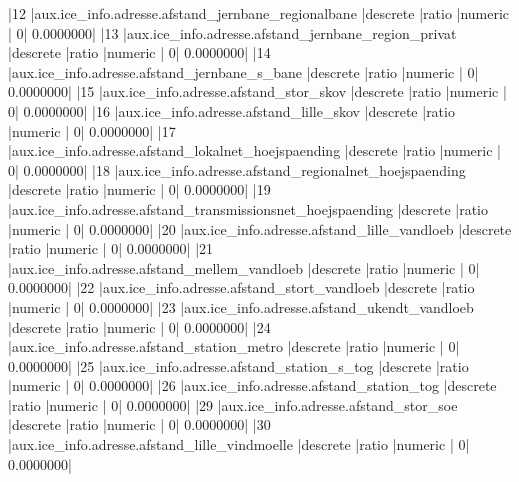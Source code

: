 \documentclass{report}
\begin{document}
\begin{Schunk}
\begin{Soutput}
|12  |aux.ice_info.adresse.afstand_jernbane_regionalbane            |descrete           |ratio          |numeric         |              0|          0.0000000|
|13  |aux.ice_info.adresse.afstand_jernbane_region_privat           |descrete           |ratio          |numeric         |              0|          0.0000000|
|14  |aux.ice_info.adresse.afstand_jernbane_s_bane                  |descrete           |ratio          |numeric         |              0|          0.0000000|
|15  |aux.ice_info.adresse.afstand_stor_skov                        |descrete           |ratio          |numeric         |              0|          0.0000000|
|16  |aux.ice_info.adresse.afstand_lille_skov                       |descrete           |ratio          |numeric         |              0|          0.0000000|
|17  |aux.ice_info.adresse.afstand_lokalnet_hoejspaending           |descrete           |ratio          |numeric         |              0|          0.0000000|
|18  |aux.ice_info.adresse.afstand_regionalnet_hoejspaending        |descrete           |ratio          |numeric         |              0|          0.0000000|
|19  |aux.ice_info.adresse.afstand_transmissionsnet_hoejspaending   |descrete           |ratio          |numeric         |              0|          0.0000000|
|20  |aux.ice_info.adresse.afstand_lille_vandloeb                   |descrete           |ratio          |numeric         |              0|          0.0000000|
|21  |aux.ice_info.adresse.afstand_mellem_vandloeb                  |descrete           |ratio          |numeric         |              0|          0.0000000|
|22  |aux.ice_info.adresse.afstand_stort_vandloeb                   |descrete           |ratio          |numeric         |              0|          0.0000000|
|23  |aux.ice_info.adresse.afstand_ukendt_vandloeb                  |descrete           |ratio          |numeric         |              0|          0.0000000|
|24  |aux.ice_info.adresse.afstand_station_metro                    |descrete           |ratio          |numeric         |              0|          0.0000000|
|25  |aux.ice_info.adresse.afstand_station_s_tog                    |descrete           |ratio          |numeric         |              0|          0.0000000|
|26  |aux.ice_info.adresse.afstand_station_tog                      |descrete           |ratio          |numeric         |              0|          0.0000000|
|29  |aux.ice_info.adresse.afstand_stor_soe                         |descrete           |ratio          |numeric         |              0|          0.0000000|
|30  |aux.ice_info.adresse.afstand_lille_vindmoelle                 |descrete           |ratio          |numeric         |              0|          0.0000000|

\end{Soutput}
\end{Schunk}
\end{document}
